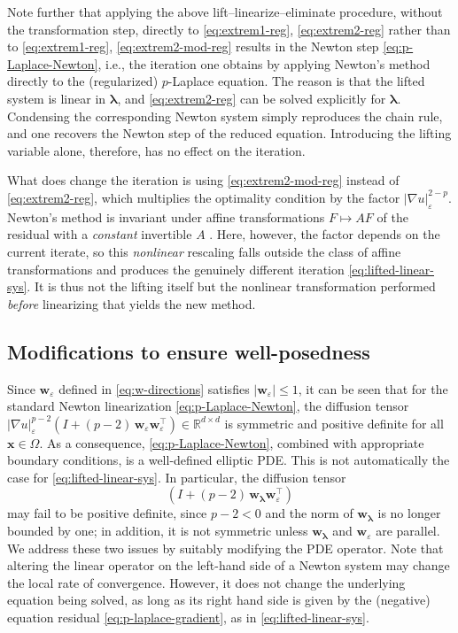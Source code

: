 \documentclass[11pt,pdflatex,sn-mathphys-num]{sn-jnl}
\theoremstyle{thmstyleone}%
\theoremstyle{thmstyletwo}%
\theoremstyle{thmstylethree}%
\newcommand{\bs}[1]{\ensuremath{\boldsymbol{#1}}}
\begin{document}
Note further that applying the above lift--linearize--eliminate procedure, without the transformation step, directly to \eqref{eq:extrem1-reg}, \eqref{eq:extrem2-reg} rather than to \eqref{eq:extrem1-reg}, \eqref{eq:extrem2-mod-reg} results in the Newton step \eqref{eq:p-Laplace-Newton}, i.e., the iteration one obtains by applying Newton's method directly to the (regularized) $p$-Laplace equation. The reason is that the lifted system is linear in $\bs\lambda$, and \eqref{eq:extrem2-reg} can be solved explicitly for $\bs\lambda$. Condensing the corresponding Newton system simply reproduces the chain rule, and one recovers the Newton step of the reduced equation. Introducing the lifting variable alone, therefore, has no effect on the iteration. 

What does change the iteration is using \eqref{eq:extrem2-mod-reg} instead of \eqref{eq:extrem2-reg}, which multiplies the optimality condition by the factor $|\nabla u|_\varepsilon^{2-p}$. Newton's method is invariant under affine transformations $F\mapsto AF$ of the residual with a \emph{constant} invertible $A$ \cite{Deuflhard04}. Here, however, the factor depends on the current iterate, so this {\em nonlinear} rescaling falls outside the class of affine transformations and produces the genuinely different iteration \eqref{eq:lifted-linear-sys}. It is thus not the lifting itself but the nonlinear transformation performed \emph{before} linearizing that yields the new method.

\subsection{Modifications to ensure well-posedness}\label{ssec:modifications}
Since $\bs w_\varepsilon$ defined in \eqref{eq:w-directions} satisfies $|\bs w_\varepsilon|
\le1$, it can be seen that for the standard Newton linearization \eqref{eq:p-Laplace-Newton}, the diffusion tensor $|\nabla u|_\varepsilon^{p-2}\left(I + (p-2)\,\bs w_\varepsilon\bs w_\varepsilon^\top\right)\in \mathbb R^{d\times d}$ is symmetric and positive definite for all $\bs x\in \Omega$.
As a consequence, \eqref{eq:p-Laplace-Newton}, combined with appropriate boundary conditions, is a well-defined elliptic PDE. This is not automatically the case for \eqref{eq:lifted-linear-sys}. In particular, the diffusion tensor
\begin{equation}\label{eq:lifted-tensor}
    \left(I + (p-2)\,\bs w_{\bs\lambda}\bs w_\varepsilon^\top\right)
\end{equation}
may fail to be positive definite, since $p-2<0$ and the norm of $\bs w_{\bs\lambda}$ is no longer bounded by one; in addition, it is not symmetric unless $\bs w_{\bs\lambda}$ and $\bs w_\varepsilon$ are parallel.
We address these two issues by suitably modifying the PDE operator. Note that altering the linear operator on the left-hand side of a Newton system may change the local rate of convergence. However, it does not change the underlying equation being solved, as long as its right hand side is given by the (negative) equation residual \eqref{eq:p-laplace-gradient},
as in \eqref{eq:lifted-linear-sys}.
\end{document}
